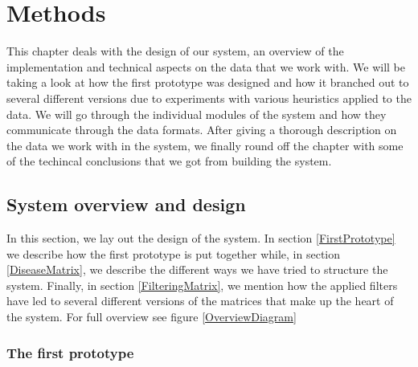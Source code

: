 \chapter{Methods\label{Methods}}

This chapter deals with the design of our system, an overview of the
implementation and technical aspects on the data that we work with. We
will be taking a look at how the first prototype was designed and how
it branched out to several different versions due to experiments with
various heuristics applied to the data. We will go through the
individual modules of the system and how they communicate through the
data formats. After giving a thorough description on the data we work
with in the system, we finally round off the chapter with some of the
techincal conclusions that we got from building the system.

\section{System overview and design\label{SystemOverviewAndDesign}}

In this section, we lay out the design of the system. In section
\ref{FirstPrototype} we describe how the first prototype is put
together while, in section \ref{DiseaseMatrix}, we describe the
different ways we have tried to structure the system. Finally, in section
\ref{FilteringMatrix}, we mention how the applied filters have led to
several different versions of the matrices that make up the heart of
the system. For full overview see figure \ref{OverviewDiagram}

\subsection{The first prototype\label{FirstPrototype}}

